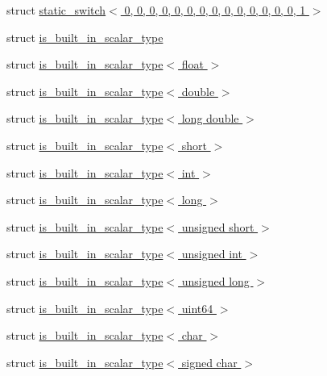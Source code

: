 \begin{DoxyCompactItemize}
\item 
struct \hyperlink{structdlib_1_1static__switch_3_010_00_010_00_010_00_010_00_010_00_010_00_010_00_010_00_010_00_0146ef5bf350d722d5ffb766430493f3da}{static\_\-switch$<$ 0, 0, 0, 0, 0, 0, 0, 0, 0, 0, 0, 0, 0, 0, 1 $>$}
\item 
struct \hyperlink{structdlib_1_1is__built__in__scalar__type}{is\_\-built\_\-in\_\-scalar\_\-type}
\item 
struct \hyperlink{structdlib_1_1is__built__in__scalar__type_3_01float_01_4}{is\_\-built\_\-in\_\-scalar\_\-type$<$ float $>$}
\item 
struct \hyperlink{structdlib_1_1is__built__in__scalar__type_3_01double_01_4}{is\_\-built\_\-in\_\-scalar\_\-type$<$ double $>$}
\item 
struct \hyperlink{structdlib_1_1is__built__in__scalar__type_3_01long_01double_01_4}{is\_\-built\_\-in\_\-scalar\_\-type$<$ long double $>$}
\item 
struct \hyperlink{structdlib_1_1is__built__in__scalar__type_3_01short_01_4}{is\_\-built\_\-in\_\-scalar\_\-type$<$ short $>$}
\item 
struct \hyperlink{structdlib_1_1is__built__in__scalar__type_3_01int_01_4}{is\_\-built\_\-in\_\-scalar\_\-type$<$ int $>$}
\item 
struct \hyperlink{structdlib_1_1is__built__in__scalar__type_3_01long_01_4}{is\_\-built\_\-in\_\-scalar\_\-type$<$ long $>$}
\item 
struct \hyperlink{structdlib_1_1is__built__in__scalar__type_3_01unsigned_01short_01_4}{is\_\-built\_\-in\_\-scalar\_\-type$<$ unsigned short $>$}
\item 
struct \hyperlink{structdlib_1_1is__built__in__scalar__type_3_01unsigned_01int_01_4}{is\_\-built\_\-in\_\-scalar\_\-type$<$ unsigned int $>$}
\item 
struct \hyperlink{structdlib_1_1is__built__in__scalar__type_3_01unsigned_01long_01_4}{is\_\-built\_\-in\_\-scalar\_\-type$<$ unsigned long $>$}
\item 
struct \hyperlink{structdlib_1_1is__built__in__scalar__type_3_01uint64_01_4}{is\_\-built\_\-in\_\-scalar\_\-type$<$ uint64 $>$}
\item 
struct \hyperlink{structdlib_1_1is__built__in__scalar__type_3_01char_01_4}{is\_\-built\_\-in\_\-scalar\_\-type$<$ char $>$}
\item 
struct \hyperlink{structdlib_1_1is__built__in__scalar__type_3_01signed_01char_01_4}{is\_\-built\_\-in\_\-scalar\_\-type$<$ signed char $>$}
\item 

\end{DoxyCompactItemize}

